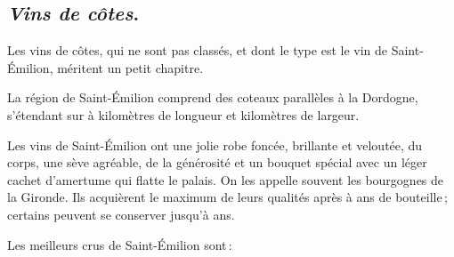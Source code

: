 \newpage
\subsection*{\centering \textit{ Vins de côtes}.}

Les vins de côtes, qui ne sont pas classés, et dont le type est le vin de
Saint-Émilion, méritent un petit chapitre.

La région de Saint-Émilion comprend des coteaux parallèles à la Dordogne,
s'étendant sur {\mmm} à {\mmm} kilomètres de longueur et {\mmm}
kilomètres de largeur.

Les vins de Saint-Émilion ont une jolie robe foncée, brillante et veloutée, du
corps, une sève agréable, de la générosité et un bouquet spécial avec un léger
cachet d'amertume qui flatte le palais. On les appelle souvent les bourgognes
de la Gironde. Ils acquièrent le maximum de leurs qualités après {\mmm}
à {\mmm} ans de bouteille ; certains peuvent se conserver jusqu'à
{\mmm} ans.

\medskip

Les meilleurs crus de Saint-Émilion sont :

